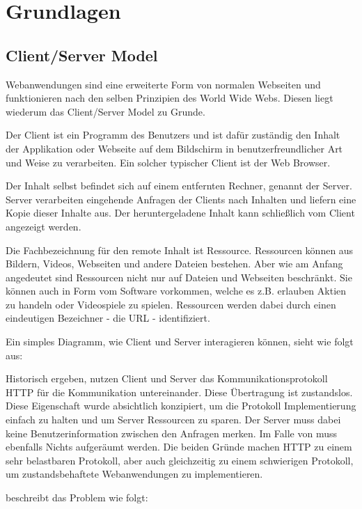 \chapter{Grundlagen}

\section{Client/Server Model}
\label{sec:client_server}

Webanwendungen sind eine erweiterte Form von normalen Webseiten und funktionieren nach den selben Prinzipien des World Wide Webs. Diesen liegt wiederum das Client/Server Model zu Grunde.

Der Client ist ein Programm des Benutzers und ist dafür zuständig den Inhalt der Applikation oder Webseite auf dem Bildschirm in benutzerfreundlicher Art und Weise zu verarbeiten. Ein solcher typischer Client ist der Web Browser.

Der Inhalt selbst befindet sich auf einem entfernten Rechner, genannt der Server. Server verarbeiten eingehende Anfragen der Clients nach Inhalten und liefern eine Kopie dieser Inhalte aus. Der heruntergeladene Inhalt kann schließlich vom Client angezeigt werden.

Die Fachbezeichnung für den remote Inhalt ist Ressource. Ressourcen können aus Bildern, Videos, Webseiten und andere Dateien bestehen. Aber wie am Anfang angedeutet sind Ressourcen nicht nur auf Dateien und Webseiten beschränkt. Sie können auch in Form vom Software vorkommen, welche es z.B. erlauben Aktien zu handeln oder Videospiele zu spielen. Ressourcen werden dabei durch einen eindeutigen Bezeichner - die URL - identifiziert.

Ein simples Diagramm, wie Client und Server interagieren können, sieht wie folgt aus:

Historisch ergeben, nutzen Client und Server das Kommunikationsprotokoll HTTP für die Kommunikation untereinander. Diese Übertragung ist zustandslos. Diese Eigenschaft wurde absichtlich konzipiert, um die Protokoll Implementierung einfach zu halten und um Server Ressourcen zu sparen. Der Server muss dabei keine Benutzerinformation zwischen den Anfragen merken. Im Falle von muss ebenfalls Nichts aufgeräumt werden. Die beiden Gründe machen HTTP zu einem sehr belastbaren Protokoll, aber auch gleichzeitig zu einem schwierigen Protokoll, um zustandsbehaftete Webanwendungen zu implementieren.

\citep[Background]{launchschool} beschreibt das Problem wie folgt:

